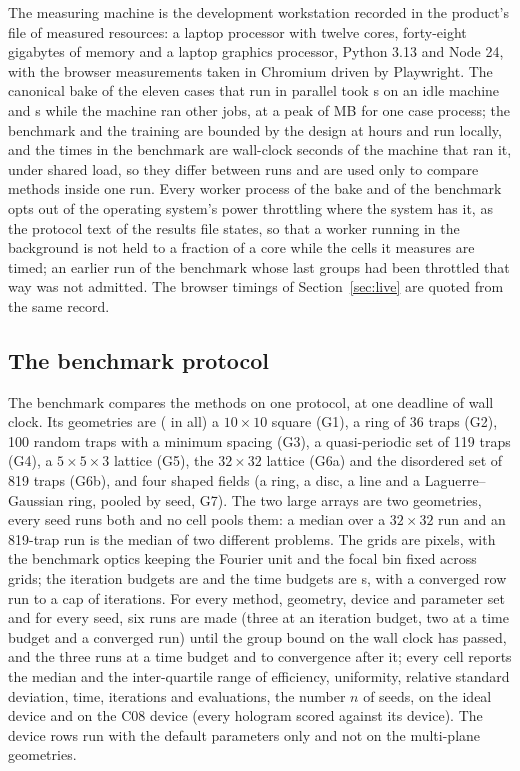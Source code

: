 The measuring machine is the development workstation recorded in the product's file of measured resources: a laptop processor with twelve cores, forty-eight gigabytes of memory and a laptop graphics processor, Python 3.13 and Node 24, with the browser measurements taken in Chromium driven by Playwright. The canonical bake of the eleven cases that run in parallel took \bakeIdleS{} s on an idle machine and \bakeLoadedS{} s while the machine ran other jobs, at a peak of \bakeCaseMB{} MB for one case process; the benchmark and the training are bounded by the design at hours and run locally, and the times in the benchmark are wall-clock seconds of the machine that ran it, under shared load, so they differ between runs and are used only to compare methods inside one run. Every worker process of the bake and of the benchmark opts out of the operating system's power throttling where the system has it, as the protocol text of the results file states, so that a worker running in the background is not held to a fraction of a core while the cells it measures are timed; an earlier run of the benchmark whose last groups had been throttled that way was not admitted. The browser timings of Section~\ref{sec:live} are quoted from the same record.

\subsection{The benchmark protocol}\label{sec:protocol-bench}

The benchmark compares the methods on one protocol, at one deadline of wall clock. Its geometries are (\benchGeometries{} in all) a $10\times10$ square (G1), a ring of 36 traps (G2), 100 random traps with a minimum spacing (G3), a quasi-periodic set of 119 traps (G4), a $5\times5\times3$ lattice (G5), the $32\times32$ lattice (G6a) and the disordered set of 819 traps (G6b), and four shaped fields (a ring, a disc, a line and a Laguerre--Gaussian ring, pooled by seed, G7). The two large arrays are two geometries, every seed runs both and no cell pools them: a median over a $32\times32$ run and an 819-trap run is the median of two different problems. The grids are \benchGrids{} pixels, with the benchmark optics keeping the Fourier unit and the focal bin fixed across grids; the iteration budgets are \benchIters{} and the time budgets are \benchTimes{} s, with a converged row run to a cap of iterations. For every method, geometry, device and parameter set and for every seed, six runs are made (three at an iteration budget, two at a time budget and a converged run) until the group bound on the wall clock has passed, and the three runs at a time budget and to convergence after it; every cell reports the median and the inter-quartile range of efficiency, uniformity, relative standard deviation, time, iterations and evaluations, the number $n$ of seeds, on the ideal device and on the C08 device (every hologram scored against its device). The device rows run with the default parameters only and not on the multi-plane geometries.

